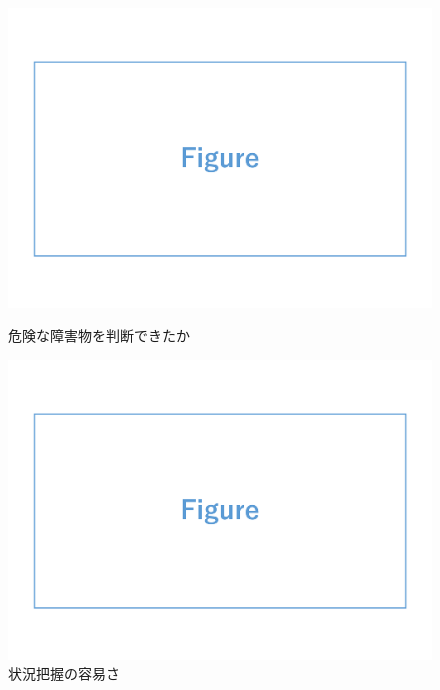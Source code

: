 \documentclass[a4paper,11pt]{ujreport}
\begin{document}
\begin{figure}[!b]
  \centering
  \begin{minipage}{0.45\linewidth}
    \centering
    \includegraphics[width=0.95\linewidth]{img/sample.pdf}
    \caption{危険な障害物を判断できたか}
    \label{fig:05_likert1}
  \end{minipage}
  \begin{minipage}{0.45\linewidth}
    \centering
    \includegraphics[width=0.95\linewidth]{img/sample.pdf}
    \caption{状況把握の容易さ}
    \label{fig:05_likert2}
  \end{minipage}
\end{figure}

\end{document}
